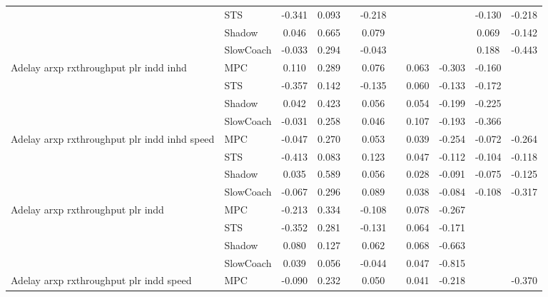 \begin{tabular}{|l|l|*{9}{c|}}
                              & STS &   -0.341 &     0.093 &        & -0.218 &     &     &      &  -0.130 &   -0.218 \\
                              & Shadow &    0.046 &     0.665 &        &  0.079 &     &     &      &   0.069 &   -0.142 \\
                              & SlowCoach &   -0.033 &     0.294 &        & -0.043 &     &     &      &   0.188 &   -0.443 \\
\midrule
Adelay arxp rxthroughput plr indd inhd    & MPC &    0.110 &     0.289 &        &  0.076 &     &  0.063 &  -0.303 &  -0.160 &       \\
                              & STS &   -0.357 &     0.142 &        & -0.135 &     &  0.060 &  -0.133 &  -0.172 &       \\
                              & Shadow &    0.042 &     0.423 &        &  0.056 &     &  0.054 &  -0.199 &  -0.225 &       \\
                              & SlowCoach &   -0.031 &     0.258 &        &  0.046 &     &  0.107 &  -0.193 &  -0.366 &       \\
\midrule
Adelay arxp rxthroughput plr indd inhd speed    & MPC &   -0.047 &     0.270 &        &  0.053 &     &  0.039 &  -0.254 &  -0.072 &   -0.264 \\
                              & STS &   -0.413 &     0.083 &        &  0.123 &     &  0.047 &  -0.112 &  -0.104 &   -0.118 \\
                              & Shadow &    0.035 &     0.589 &        &  0.056 &     &  0.028 &  -0.091 &  -0.075 &   -0.125 \\
                              & SlowCoach &   -0.067 &     0.296 &        &  0.089 &     &  0.038 &  -0.084 &  -0.108 &   -0.317 \\
\midrule
Adelay arxp rxthroughput plr indd    & MPC &   -0.213 &     0.334 &        & -0.108 &     &  0.078 &  -0.267 &      &       \\
                              & STS &   -0.352 &     0.281 &        & -0.131 &     &  0.064 &  -0.171 &      &       \\
                              & Shadow &    0.080 &     0.127 &        &  0.062 &     &  0.068 &  -0.663 &      &       \\
                              & SlowCoach &    0.039 &     0.056 &        & -0.044 &     &  0.047 &  -0.815 &      &       \\
\midrule
Adelay arxp rxthroughput plr indd speed    & MPC &   -0.090 &     0.232 &        &  0.050 &     &  0.041 &  -0.218 &      &   -0.370 \\

\end{tabular}
